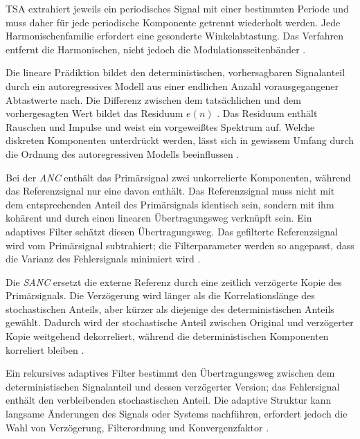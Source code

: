 TSA extrahiert jeweils ein periodisches Signal mit einer bestimmten Periode
und muss daher für jede periodische Komponente getrennt wiederholt werden.
Jede Harmonischenfamilie erfordert eine gesonderte Winkelabtastung. Das
Verfahren entfernt die Harmonischen, nicht jedoch die Modulationsseitenbänder
\cite[S.~11; S.~18]
{randallComparisonMethodsSeparation2011}.

Die lineare Prädiktion bildet den deterministischen, vorhersagbaren
Signalanteil durch ein autoregressives Modell aus einer endlichen Anzahl
vorausgegangener Abtastwerte nach. Die Differenz zwischen dem tatsächlichen
und dem vorhergesagten Wert bildet das Residuum $e(n)$
\cites[S.~180--181, Abschn.~5.3.2]
{randallVibrationbasedConditionMonitoring2022}
[S.~13--14, Abschn.~3]
{randallComparisonMethodsSeparation2011}.
Das Residuum enthält Rauschen und Impulse und weist ein vorgeweißtes
Spektrum auf. Welche diskreten Komponenten unterdrückt werden, lässt sich
in gewissem Umfang durch die Ordnung des autoregressiven Modells beeinflussen
\cites[S.~181 und 183, Abschn.~5.3.2]
{randallVibrationbasedConditionMonitoring2022}
[S.~13--14, Abschn.~3]{randallComparisonMethodsSeparation2011}.

Bei der \emph{\gls{ANC}} enthält das Primärsignal zwei unkorrelierte Komponenten,
während das Referenzsignal nur eine davon enthält. Das Referenzsignal muss
nicht mit dem entsprechenden Anteil des Primärsignals identisch sein, sondern
mit ihm kohärent und durch einen linearen Übertragungsweg verknüpft sein. Ein
adaptives Filter schätzt diesen Übertragungsweg. Das gefilterte
Referenzsignal wird vom Primärsignal subtrahiert; die Filterparameter werden
so angepasst, dass die Varianz des Fehlersignals minimiert wird
\cites[S.~183, Abschn.~5.3.3]
{randallVibrationbasedConditionMonitoring2022}
[S.~14, Abschn.~4]{randallComparisonMethodsSeparation2011}.

Die \emph{\gls{SANC}} ersetzt die externe Referenz durch eine zeitlich verzögerte
Kopie des Primärsignals. Die Verzögerung wird länger als die
Korrelationslänge des stochastischen Anteils, aber kürzer als diejenige des
deterministischen Anteils gewählt. Dadurch wird der stochastische Anteil zwischen
Original und verzögerter Kopie weitgehend dekorreliert, während die
deterministischen Komponenten korreliert bleiben
\cites[S.~183--185, Abschn.~5.3.4]
{randallVibrationbasedConditionMonitoring2022}
[S.~14--15, Abschn.~4]{randallComparisonMethodsSeparation2011}.

Ein rekursives adaptives Filter bestimmt den Übertragungsweg zwischen dem
deterministischen Signalanteil und dessen verzögerter Version; das
Fehlersignal enthält den verbleibenden stochastischen Anteil. Die adaptive
Struktur kann langsame Änderungen des Signals oder Systems nachführen,
erfordert jedoch die Wahl von Verzögerung, Filterordnung und Konvergenzfaktor
\cites[S.~184--185, Abschn.~5.3.4]
{randallVibrationbasedConditionMonitoring2022}
[S.~14--15, Abschn.~4]{randallComparisonMethodsSeparation2011}.

